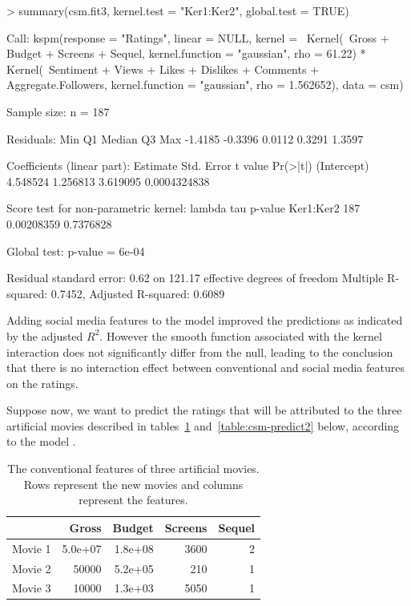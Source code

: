 \begin{example}
> summary(csm.fit3, kernel.test = "Ker1:Ker2", global.test = TRUE)
\end{example}
\begin{example}
Call:
kspm(response = "Ratings", linear = NULL, kernel = ~Kernel(~Gross + 
    Budget + Screens + Sequel, kernel.function = "gaussian", 
    rho = 61.22) * Kernel(~Sentiment + Views + Likes + Dislikes + 
    Comments + Aggregate.Followers, kernel.function = "gaussian", 
    rho = 1.562652), data = csm)

Sample size:
n = 187

Residuals: 
    Min      Q1  Median      Q3     Max 
-1.4185 -0.3396  0.0112  0.3291  1.3597 

Coefficients (linear part): 
            Estimate Std. Error  t value     Pr(>|t|)
(Intercept) 4.548524   1.256813 3.619095 0.0004324838

Score test for non-parametric kernel: 
          lambda        tau   p-value
Ker1:Ker2    187 0.00208359 0.7376828

Global test: p-value = 6e-04

Residual standard error: 0.62 on 121.17 effective degrees of freedom
Multiple R-squared: 0.7452, Adjusted R-squared: 0.6089
\end{example}


Adding social media features to the model improved the predictions as indicated by the adjusted $R^2$. However the smooth function associated with the kernel interaction does not significantly differ from the null, leading to the conclusion that there is no interaction effect between conventional and social media features on the ratings. 



Suppose now, we want to predict the ratings that will be attributed to the three artificial movies described in tables~\ref{table:csm-predict1} and~\ref{table:csm-predict2} below, according to the model .

\begin{table}[htbp]
\centering
\begin{tabular}{rrrrr}
\toprule
& Gross & Budget & Screens & Sequel  \\
\midrule
Movie 1 & 5.0e+07 & 1.8e+08 &   3600    &  2   \\
Movie 2 & 50000 & 5.2e+05  &   210  &    1    \\
Movie 3 & 10000 & 1.3e+03   & 5050  &    1   \\
 \bottomrule
\end{tabular}
\caption{\label{table:csm-predict1} The conventional features of three artificial movies. Rows represent the new movies and columns represent the features.}
\end{table}

